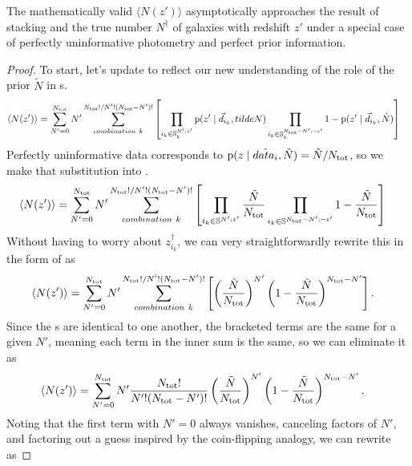 \begin{theorem}
	\label{thm:uninformative}
	The mathematically valid $\langle N(z') \rangle$ asymptotically approaches the result of stacking and the true number $N^{\dagger}$ of galaxies with redshift $z'$ under a special case of perfectly uninformative photometry and perfect prior information.
\end{theorem}
\begin{proof}
	To start, let's update  to reflect our new understanding of the role of the prior $\tilde{N}$ in \pzpdf s.
	\begin{align}
	\label{eqn:proofwithprior1}
	\langle N(z') \rangle &= \sum_{N' = 0}^{N_{\mathrm{tot}}} N' \sum_{combination\ k}^{N_{\mathrm{tot}}! / N'! (N_{\mathrm{tot}} - N')!} \left[ \prod_{i_{k} \in \mathbb{S}^{N'; z'}_{k}} \mathrm{p}(z' \mid \vec{d}_{i_{k}}, tilde{N}) \prod_{i_{k} \in \mathbb{S}^{N_{\mathrm{tot}} - N'; \lnot z'}_{k}} 1 - \mathrm{p}(z' \mid \vec{d}_{i_{k}}, \tilde{N}) \right]
	\end{align}
	Perfectly uninformative data corresponds to $\mathrm{p}(z \mid \tilde{data_{i}}, \tilde{N}) = \tilde{N} / N_{\mathrm{tot}}$, so we make that substitution into .
	\begin{align}
	\eqlabel{eqn:proofwithprior2}
	\langle N(z') \rangle &= \sum_{N' = 0}^{\ntot} N' \sum_{combination\ k}^{\ntot! / N'! (\ntot - N')!} \left[ \prod_{i_{k} \in \mathbb{S}^{N'; z'}} \frac{\tilde{N}}{\ntot} \prod_{i_{k} \in \mathbb{S}^{\ntot - N'; \lnot z'}} 1 - \frac{\tilde{N}}{\ntot} \right]
	\end{align}
	Without having to worry about $z^{\dagger}_{i_{k}}$, we can very straightforwardly rewrite this in the form of  as
	\begin{align}
	\eqlabel{eqn:proofwithprior3}
	\langle N(z') \rangle &= \sum_{N' = 0}^{\ntot} N' \sum_{combination\ k}^{\ntot! / N'! (\ntot - N')!} \left[ \left(\frac{\tilde{N}}{\ntot}\right)^{N'} \left(1 - \frac{\tilde{N}}{\ntot}\right)^{\ntot - N'} \right] .
	\end{align}
	Since the \pzpdf s are identical to one another, the bracketed terms are the same for a given $N'$, meaning each term in the inner sum is the same, so we can eliminate it as 
	\begin{align}
	\eqlabel{eqn:proofwithprior4}
	\langle N(z') \rangle &= \sum_{N' = 0}^{\ntot} N' \frac{\ntot!}{N'! (\ntot - N')!} \left(\frac{\tilde{N}}{\ntot}\right)^{N'} \left(1 - \frac{\tilde{N}}{\ntot}\right)^{\ntot - N'} .
	\end{align}
	Noting that the first term with $N' = 0$ always vanishes, canceling factors of $N'$, and factoring out a guess inspired by the coin-flipping analogy, we can rewrite  as

\end{proof}
